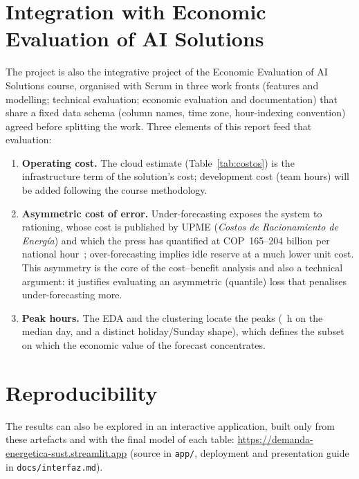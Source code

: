 \documentclass[conference,10pt]{IEEEtran}
\begin{document}
\section{Integration with Economic Evaluation of AI Solutions}\label{sec:economia}
The project is also the integrative project of the Economic Evaluation of AI Solutions course, organised with Scrum in three work fronts (features and modelling; technical evaluation; economic evaluation and documentation) that share a fixed data schema (column names, time zone, hour-indexing convention) agreed before splitting the work. Three elements of this report feed that evaluation:
\begin{enumerate}
\item \textbf{Operating cost.} The cloud estimate (Table~\ref{tab:costos}) is the infrastructure term of the solution's cost; development cost (team hours) will be added following the course methodology.
\item \textbf{Asymmetric cost of error.} Under-forecasting exposes the system to rationing, whose cost is published by UPME (\emph{Costos de Racionamiento de Energ\'ia}) and which the press has quantified at COP~165--204 billion per national hour~\cite{abc2026}; over-forecasting implies idle reserve at a much lower unit cost. This asymmetry is the core of the cost--benefit analysis and also a technical argument: it justifies evaluating an asymmetric (quantile) loss that penalises under-forecasting more.
\item \textbf{Peak hours.} The EDA and the clustering locate the peaks (\edaHoraPico~h on the median day, and a distinct holiday/Sunday shape), which defines the subset on which the economic value of the forecast concentrates.
\end{enumerate}

\section{Reproducibility}
The results can also be explored in an interactive application, built only from these artefacts and with the final model of each table: \url{https://demanda-energetica-sust.streamlit.app} (source in \texttt{app/}, deployment and presentation guide in \texttt{docs/interfaz.md}).
\end{document}
